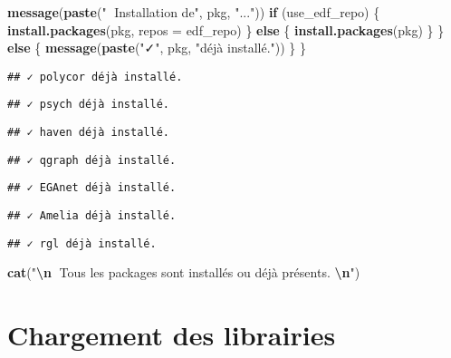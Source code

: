 \documentclass[
]{article}
\newenvironment{Shaded}{\begin{snugshade}}{\end{snugshade}}
\newcommand{\AttributeTok}[1]{\textcolor[rgb]{0.13,0.29,0.53}{#1}}
\newcommand{\ControlFlowTok}[1]{\textcolor[rgb]{0.13,0.29,0.53}{\textbf{#1}}}
\newcommand{\FunctionTok}[1]{\textcolor[rgb]{0.13,0.29,0.53}{\textbf{#1}}}
\newcommand{\NormalTok}[1]{#1}
\newcommand{\SpecialCharTok}[1]{\textcolor[rgb]{0.81,0.36,0.00}{\textbf{#1}}}
\newcommand{\StringTok}[1]{\textcolor[rgb]{0.31,0.60,0.02}{#1}}
\begin{document}
\begin{Shaded}
\begin{Highlighting}[]
    \FunctionTok{message}\NormalTok{(}\FunctionTok{paste}\NormalTok{(}\StringTok{"🔄 Installation de"}\NormalTok{, pkg, }\StringTok{"..."}\NormalTok{))}
    \ControlFlowTok{if}\NormalTok{ (use\_edf\_repo) \{}
      \FunctionTok{install.packages}\NormalTok{(pkg, }\AttributeTok{repos =}\NormalTok{ edf\_repo)}
\NormalTok{    \} }\ControlFlowTok{else}\NormalTok{ \{}
      \FunctionTok{install.packages}\NormalTok{(pkg)}
\NormalTok{    \}}
\NormalTok{  \} }\ControlFlowTok{else}\NormalTok{ \{}
    \FunctionTok{message}\NormalTok{(}\FunctionTok{paste}\NormalTok{(}\StringTok{"✓"}\NormalTok{, pkg, }\StringTok{"déjà installé."}\NormalTok{))}
\NormalTok{  \}}
\NormalTok{\}}
\end{Highlighting}
\end{Shaded}

\begin{verbatim}
## ✓ polycor déjà installé.
\end{verbatim}

\begin{verbatim}
## ✓ psych déjà installé.
\end{verbatim}

\begin{verbatim}
## ✓ haven déjà installé.
\end{verbatim}

\begin{verbatim}
## ✓ qgraph déjà installé.
\end{verbatim}

\begin{verbatim}
## ✓ EGAnet déjà installé.
\end{verbatim}

\begin{verbatim}
## ✓ Amelia déjà installé.
\end{verbatim}

\begin{verbatim}
## ✓ rgl déjà installé.
\end{verbatim}

\begin{Shaded}
\begin{Highlighting}[]
\FunctionTok{cat}\NormalTok{(}\StringTok{"}\SpecialCharTok{\textbackslash{}n}\StringTok{🎉 Tous les packages sont installés ou déjà présents. }\SpecialCharTok{\textbackslash{}n}\StringTok{"}\NormalTok{)}
\end{Highlighting}
\end{Shaded}

\section{Chargement des librairies}\label{chargement-des-librairies}
\end{document}
